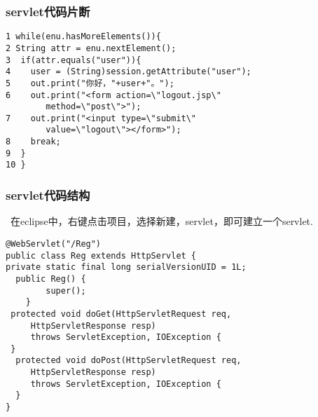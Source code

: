 \documentclass{beamer}
\begin{document}
\begin{frame}[fragile]
\frametitle{servlet代码片断}
\begin{lstlisting}
1 while(enu.hasMoreElements()){
2 String attr = enu.nextElement();
3  if(attr.equals("user")){
4    user = (String)session.getAttribute("user");
5    out.print("你好，"+user+"。");
6    out.print("<form action=\"logout.jsp\"
        method=\"post\">");
7    out.print("<input type=\"submit\" 
        value=\"logout\"></form>");
8    break;
9  }
10 }
\end{lstlisting}
\end{frame}
\begin{frame}[fragile]
\frametitle{servlet代码结构}

 在eclipse中，右键点击项目，选择新建，servlet，即可建立一个servlet.
\begin{lstlisting}
@WebServlet("/Reg")
public class Reg extends HttpServlet {
private static final long serialVersionUID = 1L;    
  public Reg() {
        super();
    }
 protected void doGet(HttpServletRequest req, 
     HttpServletResponse resp) 
     throws ServletException, IOException {
 }
  protected void doPost(HttpServletRequest req, 
     HttpServletResponse resp) 
     throws ServletException, IOException {
  }
}
\end{lstlisting}
\end{frame}
\end{document}
